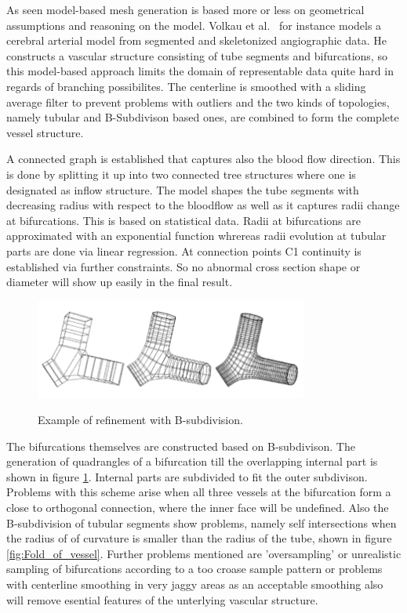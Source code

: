 As seen model-based mesh generation is based more or less on geometrical assumptions and reasoning on the model.
Volkau et al.~\cite{volkau2005geometric} for instance models a cerebral arterial model from segmented and skeletonized angiographic data. He constructs a vascular structure consisting of tube segments and bifurcations, so this model-based approach limits the domain of representable data quite hard in regards of branching possibilites. The centerline is smoothed with a sliding average filter to prevent problems with outliers and the two kinds of topologies, namely tubular and B-Subdivison based ones, are combined to form the complete vessel structure.

A connected graph is established that captures also the blood flow direction. This is done by splitting it up into two connected tree structures where one is designated as inflow structure. The model shapes the tube segments with decreasing radius with respect to the bloodflow as well as it captures radii change at bifurcations. This is based on statistical data. Radii at bifurcations are approximated with an exponential function whrereas radii evolution at tubular parts are done via linear regression. At connection points C1 continuity is established via further constraints. So no abnormal cross section shape or diameter will show up easily in the final result.

\begin{figure}[h]
	\centering
	\includegraphics[width=0.8\textwidth]{./Images/B-subdivision_refinement.png} \\
	\caption{Example of refinement with B-subdivision.}
	\cite{volkau2005geometric}
	\label{fig:B-subdivision_refinement}
\end{figure}

The bifurcations themselves are constructed based on B-subdivison. The generation of quadrangles of a bifurcation till the overlapping internal part is shown in figure \ref{fig:B-subdivision_refinement}. Internal parts are subdivided to fit the outer subdivison. Problems with this scheme arise when all three vessels at the bifurcation form a close to orthogonal connection, where the inner face will be undefined. Also the B-subdivision of tubular segments show problems, namely self intersections when the radius of of curvature is smaller than the radius of the tube, shown in figure \ref{fig:Fold_of_vessel}.
Further problems mentioned are 'oversampling' or unrealistic sampling of bifurcations according to a too croase sample pattern or problems with centerline smoothing in very jaggy areas as an acceptable smoothing also will remove esential features of the unterlying vascular structure.  

